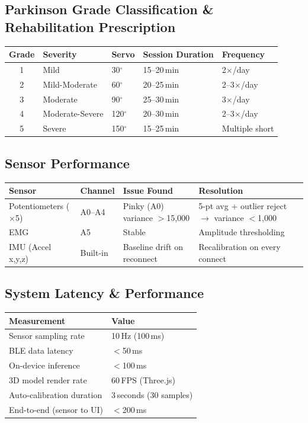 \documentclass[12pt,a4paper]{article}
\begin{document}
\subsection{Parkinson Grade Classification \& Rehabilitation Prescription}
\begin{center}
\begin{tabular}{@{}cllll@{}}
\toprule
\textbf{Grade} & \textbf{Severity} & \textbf{Servo} & \textbf{Session Duration} & \textbf{Frequency} \\
\midrule
1 & Mild             & 30$^\circ$  & 15--20\,min & 2$\times$/day \\
2 & Mild-Moderate    & 60$^\circ$  & 20--25\,min & 2--3$\times$/day \\
3 & Moderate         & 90$^\circ$  & 25--30\,min & 3$\times$/day \\
4 & Moderate-Severe  & 120$^\circ$ & 20--30\,min & 2--3$\times$/day \\
5 & Severe           & 150$^\circ$ & 15--25\,min & Multiple short \\
\bottomrule
\end{tabular}
\end{center}

\subsection{Sensor Performance}
\begin{center}
\begin{tabular}{@{}p{3.5cm} p{1.5cm} p{4.5cm} p{4.5cm}@{}}
\toprule
\textbf{Sensor} & \textbf{Channel} & \textbf{Issue Found} & \textbf{Resolution} \\
\midrule
Potentiometers ($\times$5) & A0--A4 & Pinky (A0) variance $>$15,000 & 5-pt avg + outlier reject $\rightarrow$ variance $<$1,000 \\
EMG & A5 & Stable & Amplitude thresholding \\
IMU (Accel x,y,z) & Built-in & Baseline drift on reconnect & Recalibration on every connect \\
\bottomrule
\end{tabular}
\end{center}

\subsection{System Latency \& Performance}
\begin{center}
\begin{tabular}{@{}ll@{}}
\toprule
\textbf{Measurement} & \textbf{Value} \\
\midrule
Sensor sampling rate       & 10\,Hz (100\,ms) \\
BLE data latency           & $<$50\,ms \\
On-device inference        & $<$100\,ms \\
3D model render rate       & 60\,FPS (Three.js) \\
Auto-calibration duration  & 3\,seconds (30 samples) \\
End-to-end (sensor to UI)  & $<$200\,ms \\
\bottomrule
\end{tabular}
\end{center}
\end{document}
